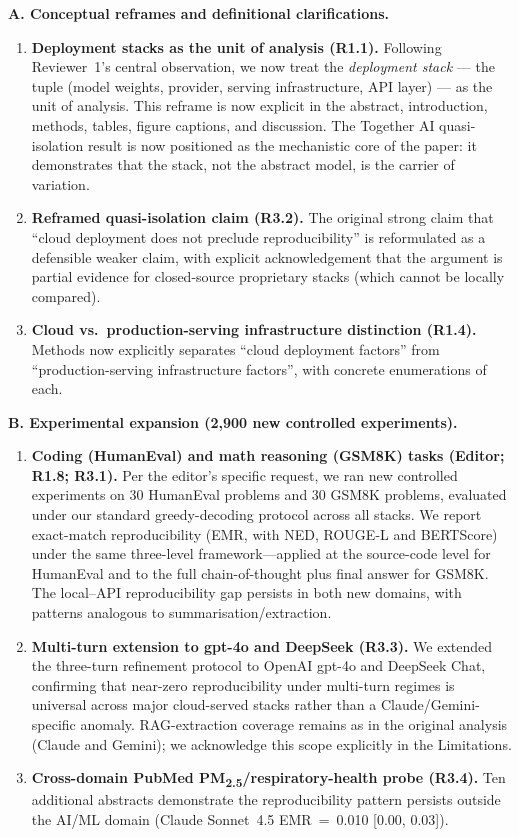 \documentclass[11pt,a4paper]{article}
\begin{document}
\medskip
\noindent\textbf{A. Conceptual reframes and definitional clarifications.}
\begin{enumerate}[leftmargin=*]
  \item \textbf{Deployment stacks as the unit of analysis (R1.1).} Following Reviewer~1's central observation, we now treat the \emph{deployment stack} --- the tuple (model weights, provider, serving infrastructure, API layer) --- as the unit of analysis. This reframe is now explicit in the abstract, introduction, methods, tables, figure captions, and discussion. The Together AI quasi-isolation result is now positioned as the mechanistic core of the paper: it demonstrates that the stack, not the abstract model, is the carrier of variation.

  \item \textbf{Reframed quasi-isolation claim (R3.2).} The original strong claim that ``cloud deployment does not preclude reproducibility'' is reformulated as a defensible weaker claim, with explicit acknowledgement that the argument is partial evidence for closed-source proprietary stacks (which cannot be locally compared).

  \item \textbf{Cloud vs.\ production-serving infrastructure distinction (R1.4).} Methods now explicitly separates ``cloud deployment factors'' from ``production-serving infrastructure factors'', with concrete enumerations of each.
\end{enumerate}

\medskip
\noindent\textbf{B. Experimental expansion (2{,}900 new controlled experiments).}
\begin{enumerate}[leftmargin=*,resume]
  \item \textbf{Coding (HumanEval) and math reasoning (GSM8K) tasks (Editor; R1.8; R3.1).} Per the editor's specific request, we ran new controlled experiments on 30 HumanEval problems and 30 GSM8K problems, evaluated under our standard greedy-decoding protocol across all stacks. We report exact-match reproducibility (EMR, with NED, ROUGE-L and BERTScore) under the same three-level framework---applied at the source-code level for HumanEval and to the full chain-of-thought plus final answer for GSM8K. The local--API reproducibility gap persists in both new domains, with patterns analogous to summarisation/extraction.

  \item \textbf{Multi-turn extension to gpt-4o and DeepSeek (R3.3).} We extended the three-turn refinement protocol to OpenAI gpt-4o and DeepSeek Chat, confirming that near-zero reproducibility under multi-turn regimes is universal across major cloud-served stacks rather than a Claude/Gemini-specific anomaly. RAG-extraction coverage remains as in the original analysis (Claude and Gemini); we acknowledge this scope explicitly in the Limitations.

  \item \textbf{Cross-domain PubMed PM\textsubscript{2.5}/respiratory-health probe (R3.4).} Ten additional abstracts demonstrate the reproducibility pattern persists outside the AI/ML domain (Claude Sonnet~4.5 EMR~=~0.010 [0.00, 0.03]).
\end{enumerate}
\end{document}
